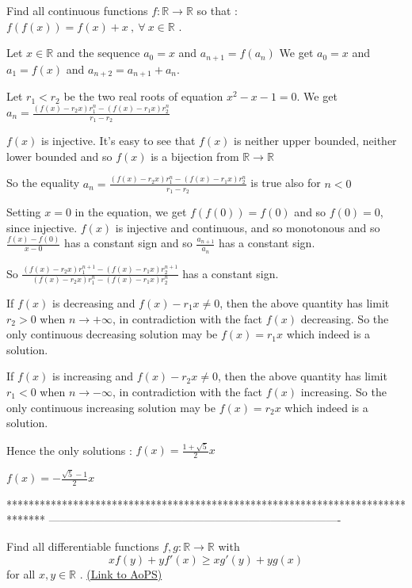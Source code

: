\begin{solution}
	\begin{tcolorbox}Find all continuous functions $f:\mathbb{R}\to\mathbb{R}$ so that : $f(f(x))=f(x)+x\ ,\ \forall\ x\in\mathbb{R}$ .\end{tcolorbox}
Let $x\in\mathbb R$ and the sequence $a_0=x$ and $a_{n+1}=f(a_n)$
We get $a_0=x$ and $a_1=f(x)$ and $a_{n+2}=a_{n+1}+a_n$.

Let $r_1<r_2$ be the two real roots of equation $x^2-x-1=0$. We get $a_n=\frac{(f(x)-r_2x)r_1^n-(f(x)-r_1x)r_2^n}{r_1-r_2}$

$f(x)$ is injective.
It's easy to see that $f(x)$ is neither upper bounded, neither lower bounded and so $f(x)$ is a bijection from $\mathbb R\to\mathbb R$

So the equality $a_n=\frac{(f(x)-r_2x)r_1^n-(f(x)-r_1x)r_2^n}{r_1-r_2}$ is true also for $n<0$

Setting $x=0$ in the equation, we get $f(f(0))=f(0)$ and so $f(0)=0$, since injective.
$f(x)$ is injective  and continuous, and so monotonous and so $\frac{f(x)-f(0)}{x-0}$ has a constant sign and so $\frac{a_{n+1}}{a_n}$ has a constant sign.

So $\frac{(f(x)-r_2x)r_1^{n+1}-(f(x)-r_1x)r_2^{n+1}}{(f(x)-r_2x)r_1^n-(f(x)-r_1x)r_2^n}$ has a constant sign.

If $f(x)$ is decreasing and $f(x)-r_1x\ne 0$, then the above quantity has limit $r_2>0$ when $n\to +\infty$, in contradiction with the fact $f(x)$ decreasing. So the only continuous decreasing solution may be $f(x)=r_1x$ which indeed is a solution.

If $f(x)$ is increasing and $f(x)-r_2x\ne 0$, then the above quantity has limit $r_1<0$ when $n\to -\infty$, in contradiction with the fact $f(x)$ increasing. So the only continuous increasing solution may be $f(x)=r_2x$ which indeed is a solution.

Hence the only solutions :
$f(x)=\frac{1+\sqrt 5}2x$

$f(x)=-\frac{\sqrt 5 -1}2x$
\end{solution}
*******************************************************************************
-------------------------------------------------------------------------------

\begin{problem}
	Find all differentiable functions $f,g:\mathbb R \to \mathbb R$ with \[xf(y)+yf'(x)\ge xg'(y)+yg(x)\] for all $x,y\in \mathbb R$ .
	\flushright \href{https://artofproblemsolving.com/community/c6h401614}{(Link to AoPS)}
\end{problem}



